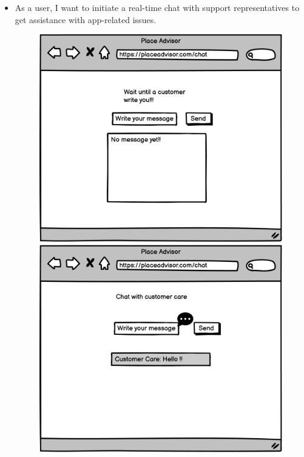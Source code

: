 \documentclass[../main.tex]{subfiles}
\begin{document}
\begin{itemize}
\begin{figure}[h]
\begin{multicols}{2}
    \end{multicols}
\end{figure}
  \item As a user, I want to initiate a real-time chat with support representatives to get assistance with app-related issues.
  \begin{figure}[h]
\begin{multicols}{2}
    \includegraphics[width=\linewidth]{../figures/mockup/US10.png}\par 
    \includegraphics[width=\linewidth]{../figures/mockup/US12.png}\par 

\end{multicols}
\end{figure}
\end{itemize}
\end{document}
